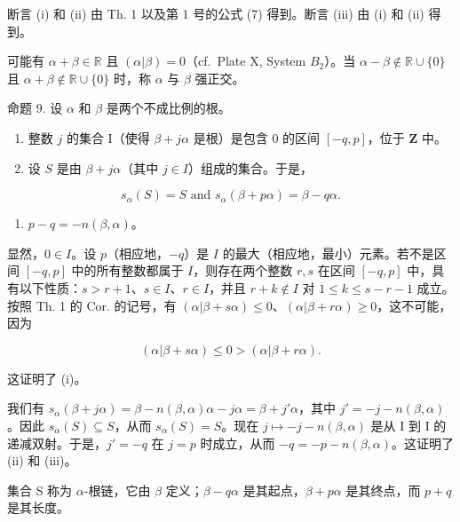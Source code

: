 断言 (i) 和 (ii) 由 Th. 1 以及第 1 号的公式 (7) 得到。断言 (iii) 由 (i) 和 (ii) 得到。

可能有 \(\alpha + \beta \in \mathbb{R}\) 且 \((\alpha|\beta) = 0\)（cf.~Plate X, System \(B_{2}\)）。当 \(\alpha - \beta \notin \mathbb{R} \cup \{0\}\) 且 \(\alpha + \beta \notin \mathbb{R} \cup \{0\}\) 时，称 \(\alpha\) 与 \(\beta\) 强正交。

命题 9. 设 \(\alpha\) 和 \(\beta\) 是两个不成比例的根。

\begin{enumerate}
\def\labelenumi{(\roman{enumi})}
\item
  整数 \(j\) 的集合 I（使得 \(\beta + j\alpha\) 是根）是包含 0 的区间 \([-q, p]\)，位于 \(\mathbf{Z}\) 中。
\item
  设 \(S\) 是由 \(\beta + j\alpha\)（其中 \(j \in I\)）组成的集合。于是，
\end{enumerate}

\[
s _ {\alpha} (S) = S \text { and } s _ {\alpha} (\beta + p \alpha) = \beta - q \alpha .
\]

\begin{enumerate}
\def\labelenumi{(\roman{enumi})}
\setcounter{enumi}{2}
\tightlist
\item
  \(p - q = -n(\beta, \alpha)\)。
\end{enumerate}

显然，\(0 \in I\)。设 \(p\)（相应地，\(-q\)）是 \(I\) 的最大（相应地，最小）元素。若不是区间 \([-q, p]\) 中的所有整数都属于 \(I\)，则存在两个整数 \(r, s\) 在区间 \([-q, p]\) 中，具有以下性质：\(s > r + 1\)、\(s \in I\)、\(r \in I\)，并且 \(r + k \notin I\) 对 \(1 \leqslant k \leqslant s - r - 1\) 成立。按照 Th. 1 的 Cor. 的记号，有 \((\alpha|\beta + s\alpha) \leqslant 0\)、\((\alpha|\beta + r\alpha) \geqslant 0\)，这不可能，因为

\[
(\alpha | \beta + s \alpha) \leqslant 0 > (\alpha | \beta + r \alpha).
\]

这证明了 (i)。

我们有 \(s_{\alpha}(\beta + j\alpha) = \beta - n(\beta, \alpha)\alpha - j\alpha = \beta + j'\alpha\)，其中 \(j' = -j - n(\beta, \alpha)\)。因此 \(s_{\alpha}(S) \subseteq S\)，从而 \(s_{\alpha}(S) = S\)。现在 \(j \mapsto -j - n(\beta, \alpha)\) 是从 I 到 I 的递减双射。于是，\(j' = -q\) 在 \(j = p\) 时成立，从而 \(-q = -p - n(\beta, \alpha)\)。这证明了 (ii) 和 (iii)。

集合 S 称为 \(\alpha\)-根链，它由 \(\beta\) 定义；\(\beta - q\alpha\) 是其起点，\(\beta + p\alpha\) 是其终点，而 \(p + q\) 是其长度。

